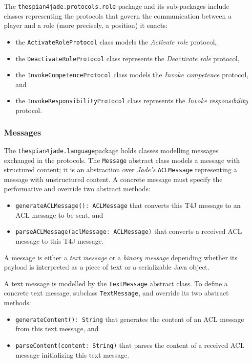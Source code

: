 The \texttt{thespian4jade.protocols.role} package and its sub-packages include classes representing the protocols that govern the communication between a player and a role (more precisely, a position) it enacts:
\begin{itemize}
	\item the \texttt{ActivateRoleProtocol} class models the \textit{Activate role} protocol,
	\item the \texttt{DeactivateRoleProtocol} class represents the \textit{Deactivate role} protocol,
	\item the \texttt{InvokeCompetenceProtocol} class models the \textit{Invoke competence} protocol, and
	\item the \texttt{InvokeResponsibilityProtocol} class represents the \textit{Invoke responsibility} protocol.
\end{itemize}

\subsubsection{Messages}

The \texttt{thespian4jade.language}package holds classes modelling messages exchanged in the protocols.
The \texttt{Message} abstract class models a message with structured content; it is an abstraction over \textit{Jade's} \texttt{ACLMessage} representing a message with unstructured content.
A concrete message must specify the performative and override two abstract methods:
\begin{itemize}
	\item \texttt{generateACLMessage(): ACLMessage} that converts this T4J message to an ACL message to be sent, and
	\item \texttt{parseACLMessage(aclMessage: ACLMessage)} that converts a received ACL message to this T4J message.
\end{itemize}

A message is either a \textit{text message} or a \textit{binary message} depending whether its payload is interpreted as a piece of text or a serializable Java object.

A text message is modelled by the \texttt{TextMessage} abstract class.
To define a concrete text message, subclass \texttt{TextMessage}, and override its two abstract methods:
\begin{itemize}
	\item \texttt{generateContent(): String} that generates the content of an ACL message from this text message, and
	\item \texttt{parseContent(content: String)} that parses the content of a received ACL message initializing this text message.
\end{itemize}

